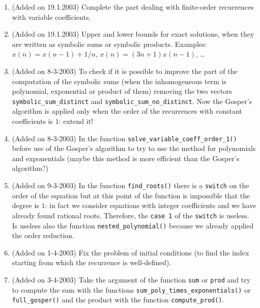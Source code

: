\documentclass[a4paper]{article}
\begin{document}
\begin{enumerate}
\item (Added on 19.1.2003)
Complete the part dealing with finite-order recurrences with variable
coefficients.

\item (Added on 19.1.2003)
Upper and lower bounds for exact solutions, when they are written as
symbolic sums or symbolic products.
Examples: $x(n) = x(n-1) + 1/n$, $x(n) = (3n+1) x(n-1)$, \dots

\item (Added on 8-3-2003)
To check if it is possible to improve the part of the computation of the
symbolic sums (when the inhomogeneous term is polynomial, exponential or
product of them) removing the two vectors \texttt{symbolic\_sum\_distinct} and
\texttt{symbolic\_sum\_no\_distinct}.
Now the Gosper's algorithm is applied only when the order of the recurrences
with constant coefficients is $1$: extend it! 

\item (Added on 8-3-2003)
In the function \texttt{solve\_variable\_coeff\_order\_1()} before use of the
Gosper's algorithm to try to use the method for polynomials and
exponentials (maybe this method is more efficient than the
Gosper's algorithm?)

\item (Added on 9-3-2003)
In the function \texttt{find\_roots()} there is a \texttt{switch} on the
order of the equation but at this point of the function is impossible
that the degree is $1$: in fact we consider equations with integer
coefficients and we have already found rational roots.
Therefore, the \texttt{case 1} of the \texttt{switch} is useless.
Is useless also the function \texttt{nested\_polynomial()} because
we already applied the order reduction. 

\item (Added on 1-4-2003)
Fix the problem of initial conditions (to find the index starting from which
the recurrence is well-defined).

\item (Added on 3-4-2003)
Take the argument of the function \verb/sum/ or \verb/prod/ and try to
compute the sum with the functions \verb/sum_poly_times_exponentials()/
or \verb/full_gosper()/ and the product with the function
\verb/compute_prod()/.
\end{enumerate}
\end{document}
